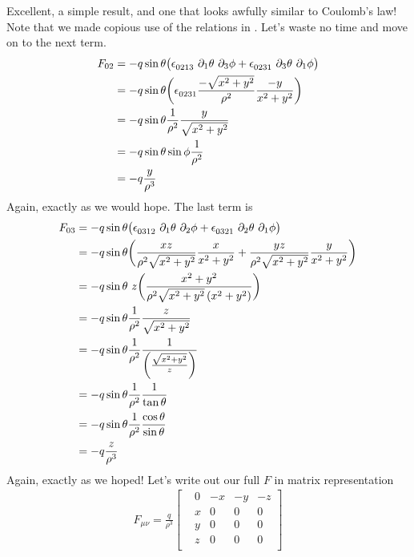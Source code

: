 %
Excellent, a simple result, and one that looks awfully similar to Coulomb's law! Note that we made copious use of the relations in \cite{Wiki:1}. Let's waste no time and move on to the next term.
%
\begin{align}
	F_{0 2} &= - q \sin{\theta} \big( \epsilon\indices{_{0213}} \ \partial_{1} \theta \ \partial_{3} \phi +  \epsilon\indices{_{0231}} \ \partial_{3} \theta \ \partial_{1} \phi \big) \\
	&= - q \sin{\theta} \bigg( \epsilon\indices{_{0231}} \frac{-\sqrt{x^2 + y^2}}{\rho^2} \frac{-y}{x^2 + y^2} \bigg) \\
	&= - q \sin{\theta} \frac{1}{\rho^2} \frac{y}{\sqrt{x^2 + y^2}} \\
	&= - q \sin{\theta} \sin{\phi} \frac{1}{\rho^2} \\
	&= - q \frac{y}{\rho^3}
\end{align} 
% 
Again, exactly as we would hope. The last term is 
%
\begin{align}
	F_{0 3} &= - q \sin{\theta} \big( \epsilon\indices{_{0312}} \ \partial_{1} \theta \ \partial_{2} \phi +  \epsilon\indices{_{0321}} \ \partial_{2} \theta \ \partial_{1} \phi \big) \\
	&= - q \sin{\theta} \bigg(\frac{xz}{\rho^2 \sqrt{x^2 + y^2}} \frac{x}{x^2 + y^2} + \frac{yz}{\rho^2 \sqrt{x^2 + y^2}} \frac{y}{x^2 + y^2}\bigg) \\
	&= - q \sin{\theta} \ z \bigg(\frac{x^2 + y^2}{\rho^2 \sqrt{x^2 + y^2} \left(x^2 + y^2\right)} \bigg) \\
	&= - q \sin{\theta} \frac{1}{\rho^2} \frac{z}{\sqrt{x^2 + y^2}} \\
	&= - q \sin{\theta} \frac{1}{\rho^2} \frac{1}{\left(\frac{\sqrt{x^2 + y^2}}{z}\right)} \\
	&= - q \sin{\theta} \frac{1}{\rho^2} \frac{1}{\tan{\theta}} \\
	&= - q \sin{\theta} \frac{1}{\rho^2} \frac{\cos{\theta}}{\sin{\theta}} \\
	&= - q \frac{z}{\rho^3}
\end{align} 
% 
Again, exactly as we hoped! Let's write out our full $F$ in matrix representation
%
\begin{align} \label{F-matrix}
	F_{\mu\nu} = \frac{q}{\rho^3} \begin{bmatrix}
		& 0 & -x  &-y & -z\\ 
		& x & 0 &0 &0 \\
		& y & 0 &0 &0 \\
		& z & 0 &0 &0 \\
	\end{bmatrix} 
\end{align}	
